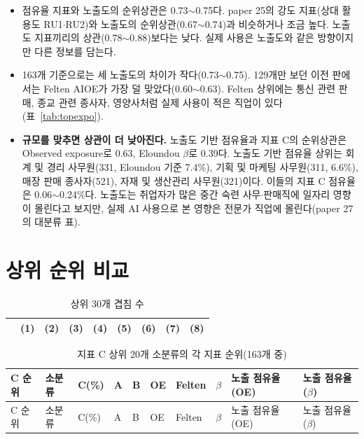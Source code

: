 \documentclass[11pt]{article}
\begin{document}
\begin{itemize}[leftmargin=*]
  \item 점유율 지표와 노출도의 순위상관은 0.73$\sim$0.75다. paper 25의 강도 지표(상대 활용도 RU1$\cdot$RU2)와 노출도의 순위상관(0.67$\sim$0.74)과 비슷하거나 조금 높다. 노출도 지표끼리의 상관(0.78$\sim$0.88)보다는 낮다. 실제 사용은 노출도와 같은 방향이지만 다른 정보를 담는다.
  \item 163개 기준으로는 세 노출도의 차이가 작다(0.73$\sim$0.75). 129개만 보던 이전 판에서는 Felten AIOE가 가장 덜 맞았다(0.60$\sim$0.63). Felten 상위에는 통신 관련 판매, 종교 관련 종사자, 영양사처럼 실제 사용이 적은 직업이 있다(표~\ref{tab:topexpo}).
  \item \textbf{규모를 맞추면 상관이 더 낮아진다.} 노출도 기반 점유율과 지표 C의 순위상관은 Observed exposure로 0.63, Eloundou $\beta$로 0.39다. 노출도 기반 점유율 상위는 회계 및 경리 사무원(331, Eloundou 기준 7.4\%), 기획 및 마케팅 사무원(311, 6.6\%), 매장 판매 종사자(521), 자재 및 생산관리 사무원(321)이다. 이들의 지표 C 점유율은 0.06$\sim$0.24\%다. 노출도는 취업자가 많은 중간 숙련 사무$\cdot$판매직에 일자리 영향이 몰린다고 보지만, 실제 AI 사용으로 본 영향은 전문가 직업에 몰린다(paper 27의 대분류 표).
\end{itemize}

\section{상위 순위 비교}

\begin{longtable}{L{4.6cm}R{1.4cm}R{1.4cm}R{1.4cm}R{1.4cm}R{1.4cm}R{1.4cm}R{1.4cm}R{1.4cm}}
\caption{상위 30개 겹침 수}\label{tab:overlap}\\
\toprule
 & (1) & (2) & (3) & (4) & (5) & (6) & (7) & (8) \\
\midrule
\endfirsthead

\bottomrule
\end{longtable}

\begin{longtable}{R{0.6cm}L{4.4cm}R{1.2cm}R{1.0cm}R{1.0cm}R{1.2cm}R{1.2cm}R{1.2cm}R{1.4cm}R{1.4cm}}
\caption{지표 C 상위 20개 소분류의 각 지표 순위(163개 중)}\label{tab:topfs}\\
\toprule
C 순위 & 소분류 & C(\%) & A & B & OE & Felten & $\beta$ & 노출 점유율(OE) & 노출 점유율($\beta$) \\
\midrule
\endfirsthead
\toprule
C 순위 & 소분류 & C(\%) & A & B & OE & Felten & $\beta$ & 노출 점유율(OE) & 노출 점유율($\beta$) \\
\midrule
\endhead

\bottomrule
\end{longtable}
\end{document}
